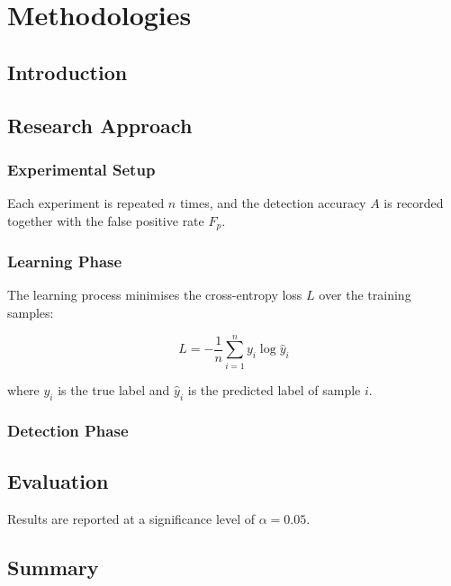 \chapter{Methodologies}\label{ch3:methodologies}

\section{Introduction}
\lipsum[11]

\section{Research Approach}
\lipsum[12] \citep{dummy2017misc}

\subsection{Experimental Setup}
\lipsum[13] Each experiment is repeated $n$ times, and the detection
accuracy $A$ is recorded together with the false positive rate
$F_{p}$.

\subsection{Learning Phase}
\lipsum[14] The learning process minimises the cross-entropy loss
$L$ over the training samples:

\begin{equation}
L = -\frac{1}{n}\sum_{i=1}^{n} y_{i}\log\hat{y}_{i}
\label{eq:example}
\end{equation}

where $y_{i}$ is the true label and $\hat{y}_{i}$ is the predicted
label of sample $i$.

\subsection{Detection Phase}
\lipsum[15]

\section{Evaluation}
\lipsum[16] Results are reported at a significance level of
$\alpha = 0.05$.

\section{Summary}
\lipsum[17]
